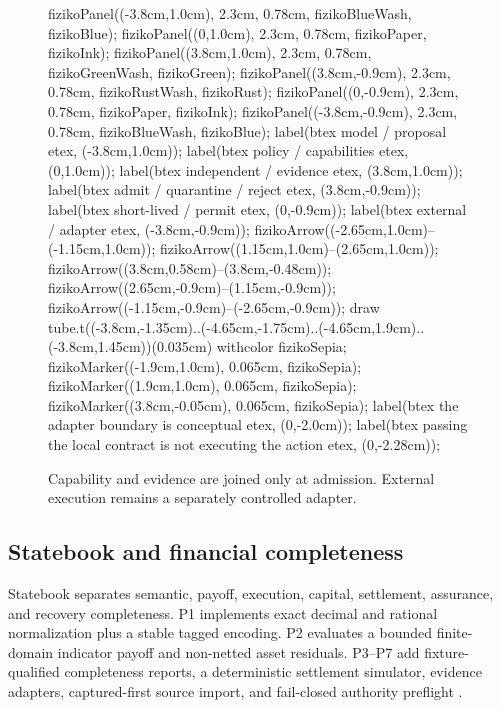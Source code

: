 \documentclass[11pt,twoside]{article}
\newcommand{\sourcecite}[1]{\parencite{#1}}
\begin{document}
\begin{figure}[t]
\centering
\mpfig
  fizikoPanel((-3.8cm,1.0cm), 2.3cm, 0.78cm, fizikoBlueWash, fizikoBlue);
  fizikoPanel((0,1.0cm), 2.3cm, 0.78cm, fizikoPaper, fizikoInk);
  fizikoPanel((3.8cm,1.0cm), 2.3cm, 0.78cm, fizikoGreenWash, fizikoGreen);
  fizikoPanel((3.8cm,-0.9cm), 2.3cm, 0.78cm, fizikoRustWash, fizikoRust);
  fizikoPanel((0,-0.9cm), 2.3cm, 0.78cm, fizikoPaper, fizikoInk);
  fizikoPanel((-3.8cm,-0.9cm), 2.3cm, 0.78cm, fizikoBlueWash, fizikoBlue);
  label(btex \scriptsize model / proposal etex, (-3.8cm,1.0cm));
  label(btex \scriptsize policy / capabilities etex, (0,1.0cm));
  label(btex \scriptsize independent / evidence etex, (3.8cm,1.0cm));
  label(btex \scriptsize admit / quarantine / reject etex, (3.8cm,-0.9cm));
  label(btex \scriptsize short-lived / permit etex, (0,-0.9cm));
  label(btex \scriptsize external / adapter etex, (-3.8cm,-0.9cm));
  fizikoArrow((-2.65cm,1.0cm)--(-1.15cm,1.0cm));
  fizikoArrow((1.15cm,1.0cm)--(2.65cm,1.0cm));
  fizikoArrow((3.8cm,0.58cm)--(3.8cm,-0.48cm));
  fizikoArrow((2.65cm,-0.9cm)--(1.15cm,-0.9cm));
  fizikoArrow((-1.15cm,-0.9cm)--(-2.65cm,-0.9cm));
  draw tube.t((-3.8cm,-1.35cm)..(-4.65cm,-1.75cm)..(-4.65cm,1.9cm)..(-3.8cm,1.45cm))(0.035cm) withcolor fizikoSepia;
  fizikoMarker((-1.9cm,1.0cm), 0.065cm, fizikoSepia);
  fizikoMarker((1.9cm,1.0cm), 0.065cm, fizikoSepia);
  fizikoMarker((3.8cm,-0.05cm), 0.065cm, fizikoSepia);
  label(btex \scriptsize the adapter boundary is conceptual etex, (0,-2.0cm));
  label(btex \scriptsize passing the local contract is not executing the action etex, (0,-2.28cm));
\endmpfig
\caption{Capability and evidence are joined only at admission. External execution remains a separately controlled adapter.}
\label{fig:controlplane}
\end{figure}

\subsection{Statebook and financial completeness}

  Statebook separates semantic, payoff, execution, capital, settlement, assurance, and recovery completeness. P1 implements exact decimal and rational normalization plus a stable tagged encoding. P2 evaluates a bounded finite-domain indicator payoff and non-netted asset residuals. P3--P7 add fixture-qualified completeness reports, a deterministic settlement simulator, evidence adapters, captured-first source import, and fail-closed authority preflight \sourcecite{repoStatebook2026}.
\end{document}
